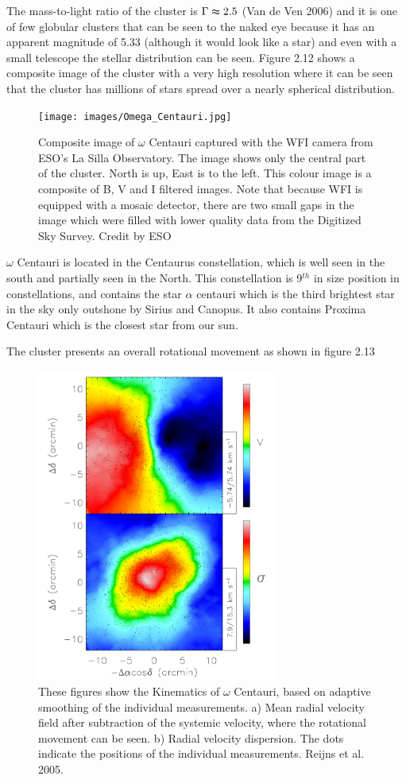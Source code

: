 The mass-to-light ratio of the cluster is $\Gamma \thickapprox 2.5$ (Van de Ven 2006) and it is one of few globular clusters that can be seen to the naked eye because it has an apparent magnitude of 5.33 (although it would look like a star) and even with a small telescope the stellar distribution can be seen. Figure 2.12 shows a composite image of the cluster with a very high resolution where it can be seen that the cluster has millions of stars spread over a nearly spherical distribution.

\begin{figure}[H]
\centering
\texttt{[image: images/Omega\_Centauri.jpg]}
\caption[Omega Centauri image]{Composite image of $\omega$ Centauri captured with the WFI camera from ESO's La Silla Observatory. The image shows only the central part of the cluster. North is up, East is to the left. This colour image is a composite of B, V and I filtered images. Note that because WFI is equipped with a mosaic detector, there are two small gaps in the image which were filled with lower quality data from the Digitized Sky Survey. Credit by ESO}
\end{figure}

$\omega$ Centauri is located in the Centaurus constellation, which is well seen in the south and partially seen in the North. This constellation is 9$^{th}$ in size position in constellations, and contains the star $\alpha$ centauri which is the third brightest star in the sky only outshone by Sirius and Canopus. It also contains Proxima Centauri which is the closest star from our sun. 

The cluster presents an overall rotational movement as shown in figure 2.13

\begin{figure}[H]
\centering
\includegraphics[width=8cm]{images/rotation_omega.png}
\caption[Omega Centauri kinematics]{These figures show the Kinematics of $\omega$ Centauri, based on adaptive smoothing of the individual measurements. a) Mean radial velocity field after subtraction of the systemic velocity, where the rotational movement can be seen. b) Radial velocity dispersion. The dots indicate the positions of the individual measurements. Reijns et al. 2005.
}
\end{figure}

